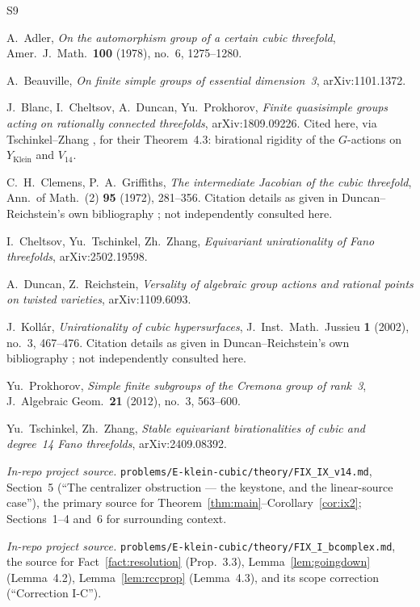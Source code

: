 \documentclass[11pt]{article}
\theoremstyle{plain}
\theoremstyle{definition}
\theoremstyle{remark}
\begin{document}
\begin{thebibliography}{S9}
\small

 A.~Adler, \emph{On the automorphism group of a certain
cubic threefold}, Amer.\ J.\ Math.\ \textbf{100} (1978), no.~6,
1275--1280.

 A.~Beauville, \emph{On finite simple groups of
essential dimension~3}, arXiv:1101.1372.

 J.~Blanc, I.~Cheltsov, A.~Duncan, Yu.~Prokhorov,
\emph{Finite quasisimple groups acting on rationally connected
threefolds}, arXiv:1809.09226. Cited here, via Tschinkel--Zhang
\cite{TZ}, for their Theorem~4.3: birational rigidity of the
$G$-actions on $Y_{\mathrm{Klein}}$ and $V_{14}$.

 C.~H.~Clemens, P.~A.~Griffiths, \emph{The intermediate
Jacobian of the cubic threefold}, Ann.\ of Math.\ (2) \textbf{95}
(1972), 281--356. Citation details as given in Duncan--Reichstein's own
bibliography \cite{DR}; not independently consulted here.

 I.~Cheltsov, Yu.~Tschinkel, Zh.~Zhang, \emph{Equivariant
unirationality of Fano threefolds}, arXiv:2502.19598.

 A.~Duncan, Z.~Reichstein, \emph{Versality of algebraic
group actions and rational points on twisted varieties},
arXiv:1109.6093.

 J.~Koll\'ar, \emph{Unirationality of cubic
hypersurfaces}, J.\ Inst.\ Math.\ Jussieu \textbf{1} (2002), no.~3,
467--476. Citation details as given in Duncan--Reichstein's own
bibliography \cite{DR}; not independently consulted here.

 Yu.~Prokhorov, \emph{Simple finite subgroups of the
Cremona group of rank~3}, J.\ Algebraic Geom.\ \textbf{21} (2012),
no.~3, 563--600.

 Yu.~Tschinkel, Zh.~Zhang, \emph{Stable equivariant
birationalities of cubic and degree~14 Fano threefolds},
arXiv:2409.08392.

 \emph{In-repo project source.}
\texttt{problems/E-klein-cubic/theory/FIX\_IX\_v14.md}, Section~5
(``The centralizer obstruction --- the keystone, and the linear-source
case''), the primary source for
Theorem~\ref{thm:main}--Corollary~\ref{cor:ix2}; Sections~1--4 and~6
for surrounding context.

 \emph{In-repo project source.}
\texttt{problems/E-klein-cubic/theory/FIX\_I\_bcomplex.md}, the source
for Fact~\ref{fact:resolution} (Prop.\ 3.3), Lemma~\ref{lem:goingdown}
(Lemma~4.2), Lemma~\ref{lem:rccprop} (Lemma~4.3), and its scope
correction (``Correction I-C'').


\end{thebibliography}
\end{document}
